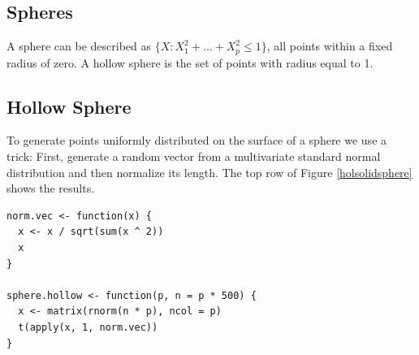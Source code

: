 \documentclass[a4paper]{report}
\begin{document}
\begin{article}
\section{Spheres}

A sphere can be described as $\{X: X_1^2+\dots + X_p^2 \leq 1\}$, all
points within a fixed radius of zero.  A hollow sphere is the set of
points with radius equal to 1.

\subsection{Hollow Sphere}

To generate points uniformly distributed on the surface of a sphere we
use a trick: First, generate a random vector from a multivariate
standard normal distribution and then normalize its length. The top
row of Figure \ref{holsolidsphere} shows the results.

\begin{verbatim}
norm.vec <- function(x) {
  x <- x / sqrt(sum(x ^ 2))
  x
}

sphere.hollow <- function(p, n = p * 500) {
  x <- matrix(rnorm(n * p), ncol = p)
  t(apply(x, 1, norm.vec))
}
\end{verbatim}


\end{article}
\end{document}
